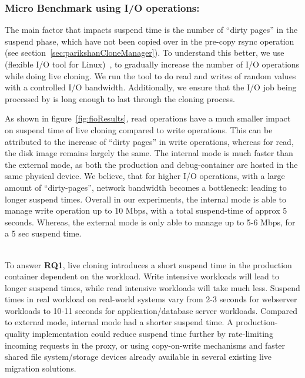 \subsubsection{Micro Benchmark using I/O operations:}
The main factor that impacts suspend time is the number of ``dirty pages'' in the suspend phase, which have not been copied over in the pre-copy rsync operation (see section~\ref{sec:parikshanCloneManager}).
To understand this better, we use \fio (flexible I/O tool for Linux)~\cite{fio}, to gradually increase the number of I/O operations while doing live cloning.
We run the \fio tool to do read and writes of random values with a controlled I/O bandwidth. 
Additionally, we ensure that the I/O job being processed by \fio is long enough to last through the cloning process.

As shown in figure~\ref{fig:fioResults}, read operations have a much smaller impact on suspend time of live cloning compared to write operations.
This can be attributed to the increase of ``dirty pages'' in write operations, whereas for read, the disk image remains largely the same.
The internal mode is much faster than the external mode, as both the production and debug-container are hosted in the same physical device.
We believe, that for higher I/O operations, with a large amount of ``dirty-pages'', network bandwidth becomes a bottleneck: leading to longer suspend times.
Overall in our experiments, the internal mode is able to manage write operation up to 10 Mbps, with a total suspend-time of approx 5 seconds.
Whereas, the external mode is only able to manage up to 5-6 Mbps, for a 5 sec suspend time.\\ \\

\begin{tcolorbox}
	To answer \textbf{RQ1}, live cloning introduces a short suspend time in the production container dependent on the workload. 
	Write intensive workloads will lead to longer suspend times, while read intensive workloads will take much less. 
	Suspend times in real workload on real-world systems vary from 2-3 seconds for webserver workloads to 10-11 seconds for application/database server workloads. 
	Compared to external mode, internal mode had a shorter suspend time. 
	A production-quality implementation could reduce suspend time further by rate-limiting incoming requests in the proxy, or using copy-on-write mechanisms and faster shared file system/storage devices already available in several existing live migration solutions.
\end{tcolorbox}

